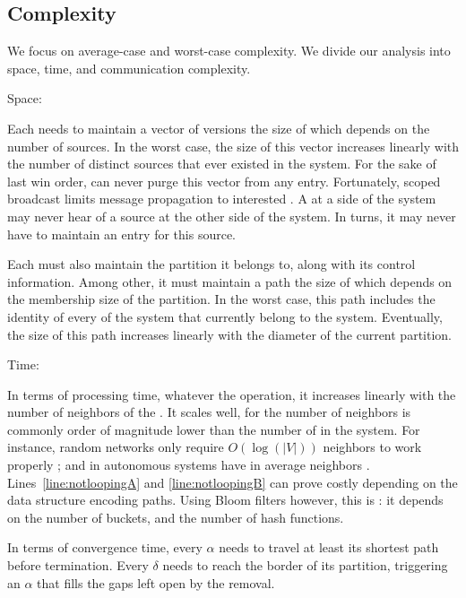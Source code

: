 



\subsection{Complexity}

We focus on average-case and worst-case complexity. We divide our
analysis into space, time, and communication complexity.

\begin{asparadesc}
\item [Space:]

Each \process needs to maintain a vector of versions the size of which
depends on the number of sources. In the worst case, the size of this
vector increases linearly with the number of distinct sources that
ever existed in the system. For the sake of last win order, \processes
can never purge this vector from any entry.  Fortunately, scoped broadcast limits
message propagation to interested \processes. A \process at a side of
the system may never hear of a source at the other side of the
system. In turns, it may never have to maintain an entry for this
source. 

\noindent Each \process must also maintain the partition it belongs to,
along with its control information. Among other, it must maintain a
path the size of which depends on the membership size of the
partition. In the worst case, this path includes the identity of every
\process of the system that currently belong to the system. Eventually,
the size of this path increases linearly with the diameter of the
current partition. 

\item[Time:]
  
In terms of processing time, whatever the operation, it increases
linearly with the number of neighbors of the \process. It scales well,
for the number of neighbors is commonly order of magnitude lower than
the number of \processes in the system. For instance, random networks
only require $O(\log(|V|))$ neighbors to work properly \REF; and
\processes in autonomous systems have in average  neighbors
\REF. Lines~\ref{line:notloopingA} and \ref{line:notloopingB} can
prove costly depending on the data structure encoding paths. Using
Bloom filters however, this is : it depends on the
number of buckets, and the number of hash functions.

\noindent In terms of convergence time, every $\alpha$ needs to travel
at least its shortest path before termination. Every $\delta$ needs to
reach the border of its partition, triggering an $\alpha$ that fills
the gaps left open by the removal. 


\end{asparadesc}
